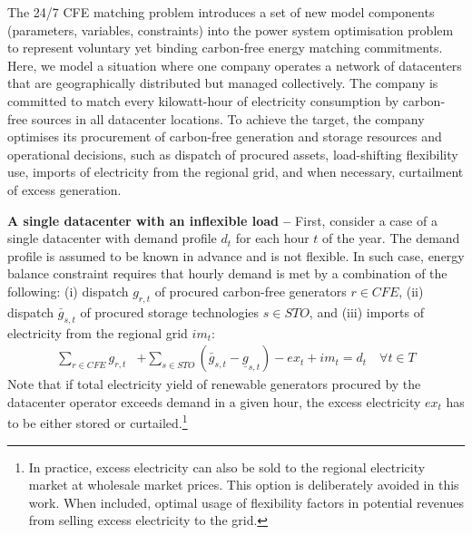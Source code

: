 
The 24/7 CFE matching problem introduces a set of new model components (parameters, variables, constraints) into the power system optimisation problem to represent voluntary yet binding carbon-free energy matching commitments. Here, we model a situation where one company operates a network of datacenters that are geographically distributed but managed collectively. The company is committed to match every kilowatt-hour of electricity consumption by carbon-free sources in all datacenter locations. To achieve the target, the company optimises its procurement of carbon-free generation and storage resources and operational decisions, such as dispatch of procured assets, load-shifting flexibility use, imports of electricity from the regional grid, and when necessary, curtailment of excess generation.

\textbf{A single datacenter with an inflexible load --} First, consider a case of a single datacenter with demand profile $d_{t}$ for each hour $t$ of the year. The demand profile is assumed to be known in advance and is not flexible. In such case, energy balance constraint requires that hourly demand is met by a combination of the following: (i) dispatch $g_{r,t}$ of procured carbon-free generators $r\in CFE$, (ii) dispatch $\bar{g}_{s,t}$ of procured storage technologies $s\in STO$, and (iii) imports of electricity from the regional grid $im_{t}$:
\begin{equation}
    \begin{split}
        \sum_{r\in CFE} g_{r,t} &+ \sum_{s\in STO} \left(\bar{g}_{s,t} - \underline{g}_{s,t}\right) - ex_t + im_t = d_t \quad \forall t \in T
    \end{split}
\label{eqn:inflexnb}
\end{equation}
Note that if total electricity yield of renewable generators procured by the datacenter operator exceeds demand in a given hour, the excess electricity $ex_t$ has to be either stored or curtailed.\footnote{In practice, excess electricity can also be sold to the regional electricity market at wholesale market prices. This option is deliberately avoided in this work. When included, optimal usage of flexibility factors in potential revenues from selling excess electricity to the grid.}

